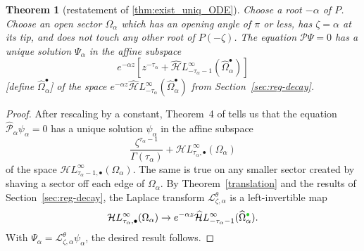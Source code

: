 \documentclass{article}
\newcommand{\singexp}[2]{\mathcal{H}L^\infty_{#1, #2}}
\newcommand{\singexpalg}[1]{\singexp{#1}{\bullet}}
\newcommand{\dualsingexp}[1]{\widehat{\mathcal{H}}L^\infty_{#1}}
\newcommand{\laplace}{\mathcal{L}}
\theoremstyle{definition}
\theoremstyle{plain}
\newtheorem{theorem}{Theorem}[section]
\newenvironment{todo}{\color{Coral}}{\color{black}}
\begin{document}
\begin{theorem}[restatement of \ref{thm:exist_uniq_ODE}]\label{re:thm:exist_uniq_ODE}
Choose a root $-\alpha$ of $P$. Choose an open sector $\Omega_\alpha$ which has an opening angle of $\pi$ or less, has $\zeta = \alpha$ at its tip, and does not touch any other root of $P(-\zeta)$. The equation $\mathcal{P}\Psi = 0$ has a unique solution $\Psi_\alpha$ in the affine subspace
\[ e^{-\alpha z} \left[ z^{-\tau_\alpha} + \dualsingexp{-\tau_\alpha-1}(\widehat{\Omega}_\alpha^\bullet) \right] \]
\begin{todo}[define $\widehat{\Omega}_\alpha^\bullet$]\end{todo} of the space $e^{-\alpha z} \dualsingexp{-\tau_\alpha}(\widehat{\Omega}_\alpha^\bullet)$ from Section~\ref{sec:reg-decay}.
\end{theorem}
\begin{center}
\label{fig:sectorial_domain--with roots P}
\end{center}
\begin{proof}
After rescaling by a constant, Theorem~4 of \cite{reg-sing-volterra} tells us that the equation $\hat{\mathcal{P}}_\alpha \psi_\alpha = 0$ has a unique solution $\psi_\alpha$ in the affine subspace
\[ \frac{\zeta^{\tau_\alpha-1}}{\Gamma(\tau_\alpha)} + \singexpalg{\tau_\alpha}(\Omega_\alpha) \]
of the space $\singexpalg{\tau_\alpha-1}(\Omega_\alpha)$. The same is true on any smaller sector created by shaving a sector off each edge of $\Omega_\alpha$. By Theorem~\ref{translation} and the results of Section~\ref{sec:reg-decay}, the Laplace transform $\laplace^\theta_{\zeta, \alpha}$ is a left-invertible map
\[ \singexpalg{\tau_\alpha}(\Omega_\alpha) \to e^{-\alpha z} \dualsingexp{-\tau_\alpha-1}(\widehat{\Omega}_\alpha^{\textcolor{LimeGreen}{\bullet}}). \]
With $\Psi_\alpha = \laplace^\theta_{\zeta, \alpha} \psi_\alpha$, the desired result follows.
\end{proof}
\end{document}
